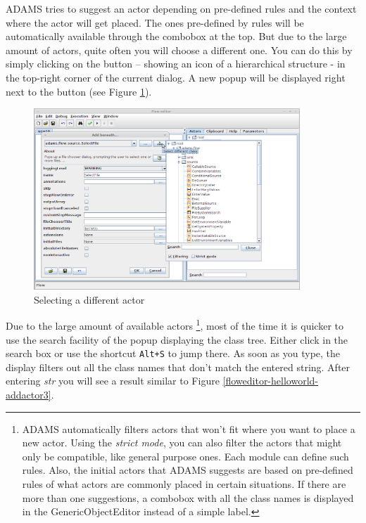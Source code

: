 ADAMS tries to suggest an actor depending on pre-defined rules and the context 
where the actor will get placed. The ones pre-defined by rules will be 
automatically available through the combobox at the top. But due to the large 
amount of actors, quite often you will choose a different one. You can do this 
by simply clicking on the button --
showing an icon of a hierarchical structure - in the top-right corner of the current dialog. A
new popup will be displayed right next to the button (see Figure
\ref{floweditor-helloworld-addactor2}).

\begin{figure}[htb]
  \centering
  \includegraphics[width=10.0cm]{images/floweditor-helloworld-addactor2.png}
  \caption{Selecting a different actor}
  \label{floweditor-helloworld-addactor2}
\end{figure}

Due to the large amount of available actors \footnote{ADAMS automatically
filters actors that won't fit where you want to place a new actor. Using the
\textit{strict mode}, you can also filter the actors that might only be
compatible, like general purpose ones. Each module can define such rules. Also,
the initial actors that ADAMS suggests are based on pre-defined rules of what
actors are commonly placed in certain situations. If there are more than one
suggestions, a combobox with all the class names is displayed in the
GenericObjectEditor instead of a simple label.}, most of the time it is quicker
to use the search facility of the popup displaying the class tree. Either click
in the search box or use the shortcut \texttt{Alt+S} to jump there. As soon as
you type, the display filters out all the class names that don't match the
entered string. After entering \textit{str} you will see a result similar to
Figure \ref{floweditor-helloworld-addactor3}.

